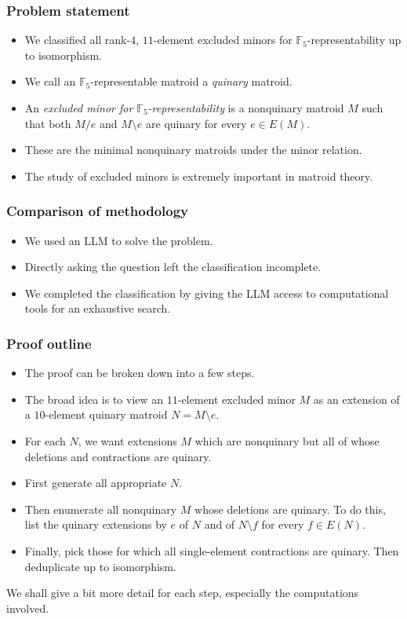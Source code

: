 \documentclass{beamer}
\newcommand{\F}{\mathbb{F}}
\begin{document}
\begin{frame}
  \frametitle{Problem statement}
  \begin{itemize}
    \item We classified all rank-$4$, $11$-element excluded minors for
      $\F_5$-representability up to isomorphism.
    \item We call an $\F_5$-representable matroid a \emph{quinary} matroid.
    \item An \emph{excluded minor for $\F_5$-representability} is a
      nonquinary matroid $M$ such that both $M/e$ and $M\setminus e$ are
      quinary for every $e\in E(M)$.
    \item These are the minimal nonquinary matroids under the minor relation.
    \item The study of excluded minors is extremely important in matroid theory.
  \end{itemize}
\end{frame}
\begin{frame}
  \frametitle{Comparison of methodology}
  \begin{itemize}
    \item We used an LLM to solve the problem.
    \item Directly asking the question left the classification incomplete.
    \item We completed the classification by giving the LLM access to
      computational tools for an exhaustive search.
  \end{itemize}
\end{frame}
\begin{frame}
  \frametitle{Proof outline}
  \begin{itemize}
    \item The proof can be broken down into a few steps.
    \item The broad idea is to view an $11$-element excluded minor $M$ as
      an extension of a $10$-element quinary matroid $N=M\setminus e$.
    \item For each $N$, we want extensions $M$ which are nonquinary but
      all of whose deletions and contractions are quinary.
    \item First generate all appropriate $N$.
    \item Then enumerate all nonquinary $M$ whose deletions are quinary.
      To do this, list the quinary extensions by $e$ of $N$ and of
      $N\setminus f$ for every $f\in E(N)$.
    \item Finally, pick those for which all single-element contractions are
      quinary. Then deduplicate up to isomorphism.
  \end{itemize}
  We shall give a bit more detail for each step, especially the computations involved.
\end{frame}
\end{document}

